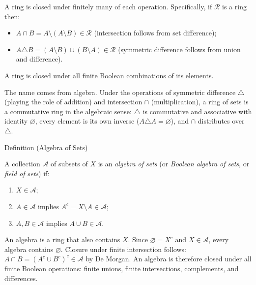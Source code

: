 \begin{remark*}
A ring is closed under finitely many of each operation. Specifically, if
$\mathcal{R}$ is a ring then:
\begin{itemize}
\item $A \cap B = A \setminus (A \setminus B) \in \mathcal{R}$ (intersection
  follows from set difference);
\item $A \triangle B = (A \setminus B) \cup (B \setminus A) \in \mathcal{R}$
  (symmetric difference follows from union and difference).
\end{itemize}
A ring is closed under all finite Boolean combinations of its elements.
\end{remark*}

\begin{remark*}
The name comes from algebra. Under the operations of symmetric difference
$\triangle$ (playing the role of addition) and intersection $\cap$
(multiplication), a ring of sets is a commutative ring in the algebraic
sense: $\triangle$ is commutative and associative with identity $\varnothing$,
every element is its own inverse ($A \triangle A = \varnothing$), and $\cap$
distributes over $\triangle$.
\end{remark*}


\begin{definitionbox}{Definition (Algebra of Sets)}
\begin{definition}\label{def:algebra-of-sets}
A collection $\mathcal{A}$ of subsets of $X$ is an \emph{algebra of sets}
(or \emph{Boolean algebra of sets}, or \emph{field of sets}) if:
\begin{enumerate}[label=(\roman*)]
\item $X \in \mathcal{A}$;
\item $A \in \mathcal{A}$ implies $A^c = X \setminus A \in \mathcal{A}$;
\item $A, B \in \mathcal{A}$ implies $A \cup B \in \mathcal{A}$.
\end{enumerate}
\end{definition}
\end{definitionbox}

\begin{remark*}
An algebra is a ring that also contains $X$. Since $\varnothing = X^c$ and
$X \in \mathcal{A}$, every algebra contains $\varnothing$. Closure under
finite intersection follows: $A \cap B = (A^c \cup B^c)^c \in \mathcal{A}$
by De Morgan. An algebra is therefore closed under all finite Boolean
operations: finite unions, finite intersections, complements, and differences.
\end{remark*}

